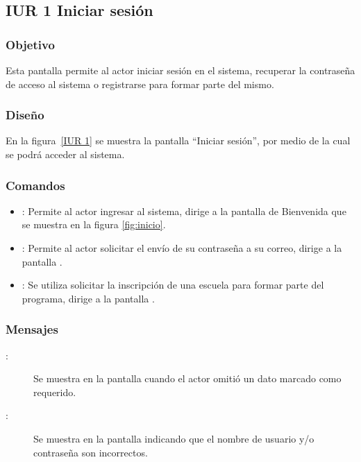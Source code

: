 \subsection{IUR 1 Iniciar sesión}
 
\subsubsection{Objetivo}

    Esta pantalla permite al actor  iniciar sesión en el sistema, recuperar la contraseña de acceso al sistema o registrarse para formar parte del mismo.

\subsubsection{Diseño}

    En la figura~\ref{IUR 1} se muestra la pantalla ``Iniciar sesión'', por medio de la cual se podrá acceder al sistema. \\


\subsubsection{Comandos}
\begin{itemize}
    \item {}: Permite al actor ingresar al sistema, dirige a la pantalla de Bienvenida que se muestra en la figura \ref{fig:inicio}.
    \item {}: Permite al actor solicitar el envío de su contraseña a su correo, dirige a la pantalla .
    \item {}: Se utiliza solicitar la inscripción de una escuela para formar parte del programa, dirige a la pantalla .
\end{itemize}

\subsubsection{Mensajes}

\begin{description}
    \item[:] Se muestra en la pantalla  cuando el actor omitió un dato marcado como requerido.
    \item[:] Se muestra en la pantalla  indicando que el nombre de usuario y/o contraseña son incorrectos.
\end{description}
